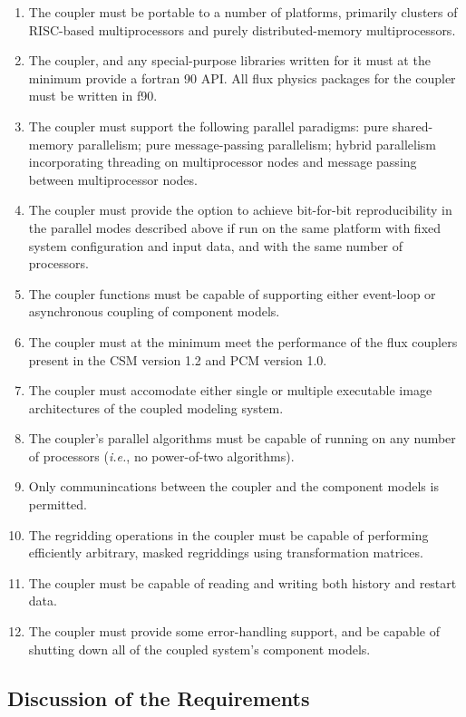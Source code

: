 \documentclass{article}
\begin{document}
\begin{enumerate}
\item The coupler must be portable to a number of platforms, primarily
clusters of RISC-based multiprocessors and purely
distributed-memory multiprocessors.
\item The coupler, and any special-purpose libraries written for
it must at the minimum provide a fortran 90 API.  All flux physics
packages for the coupler must be written in f90.
\item The coupler must support the following parallel paradigms:  
pure shared-
memory parallelism; pure message-passing parallelism; hybrid
parallelism incorporating threading on multiprocessor nodes and
message passing between multiprocessor nodes.
\item The coupler must provide the option to achieve bit-for-bit
reproducibility in the parallel modes described above if run on
the same platform with fixed system configuration and input data,
and  with the same number of processors.
\item The coupler functions must be capable of supporting either
event-loop or asynchronous coupling of component models.
\item The coupler must at the minimum meet the performance of the
flux couplers present in the CSM version 1.2 and PCM version 1.0.
\item The coupler must accomodate either single or multiple
executable image architectures of the coupled modeling system.
\item The coupler's parallel algorithms must be capable of running
on any number of processors ({\em i.e.}, no power-of-two
algorithms).
\item Only communincations between the coupler and the component
models is permitted.
\item The regridding operations in the coupler must be capable of
performing efficiently arbitrary, masked regriddings using
transformation matrices.
\item The coupler must be capable of reading and writing both
history and restart data.
\item The coupler must provide some error-handling support, and be
capable of shutting down all of the coupled system's component
models.
\end{enumerate}

\subsection{Discussion of the Requirements}
\end{document}
